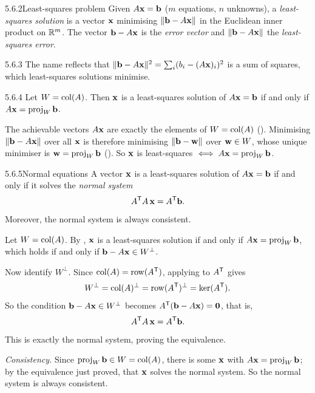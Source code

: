 \begin{defns}{5.6.2}{Least-squares problem}
Given $A\mathbf{x}=\mathbf{b}$ ($m$ equations, $n$ unknowns), a \emph{least-squares solution} is a vector $\mathbf{x}$ minimising $\lVert \mathbf{b}-A\mathbf{x} \rVert$ in the Euclidean inner product on $\mathbb{R}^m$. The vector $\mathbf{b}-A\mathbf{x}$ is the \emph{error vector} and $\lVert \mathbf{b}-A\mathbf{x} \rVert$ the \emph{least-squares error}.
\end{defns}

\begin{rmks}{5.6.3}
The name reflects that $\lVert \mathbf{b}-A\mathbf{x} \rVert^2=\sum_i(b_i-(A\mathbf{x})_i)^2$ is a sum of squares, which least-squares solutions minimise.
\end{rmks}

\begin{thms}{5.6.4}{}
Let $W=\operatorname{col}(A)$. Then $\mathbf{x}$ is a least-squares solution of $A\mathbf{x}=\mathbf{b}$ if and only if $A\mathbf{x}=\operatorname{proj}_W\mathbf{b}$.
\end{thms}

\begin{prf}
The achievable vectors $A\mathbf{x}$ are exactly the elements of $W=\operatorname{col}(A)$ (). Minimising $\lVert \mathbf{b}-A\mathbf{x} \rVert$ over all $\mathbf{x}$ is therefore minimising $\lVert \mathbf{b}-\mathbf{w} \rVert$ over $\mathbf{w}\in W$, whose unique minimiser is $\mathbf{w}=\operatorname{proj}_W\mathbf{b}$ (). So $\mathbf{x}$ is least-squares $\iff A\mathbf{x}=\operatorname{proj}_W\mathbf{b}$.
\end{prf}

\begin{thms}{5.6.5}{Normal equations}
A vector $\mathbf{x}$ is a least-squares solution of $A\mathbf{x}=\mathbf{b}$ if and only if it solves the \emph{normal system}
\[
A^{\mathsf{T}} A\,\mathbf{x}=A^{\mathsf{T}}\mathbf{b}.
\]
Moreover, the normal system is always consistent.
\end{thms}

\begin{prf}
Let $W=\operatorname{col}(A)$. By , $\mathbf{x}$ is a least-squares solution if and only if $A\mathbf{x}=\operatorname{proj}_W\mathbf{b}$, which holds if and only if $\mathbf{b}-A\mathbf{x}\in W^\perp$.

Now identify $W^\perp$. Since $\operatorname{col}(A)=\operatorname{row}(A^{\mathsf{T}})$, applying  to $A^{\mathsf{T}}$ gives
\[
W^\perp=\operatorname{col}(A)^\perp=\operatorname{row}(A^{\mathsf{T}})^\perp=\ker(A^{\mathsf{T}}).
\]
So the condition $\mathbf{b}-A\mathbf{x}\in W^\perp$ becomes $A^{\mathsf{T}}(\mathbf{b}-A\mathbf{x})=\mathbf{0}$, that is,
\[
A^{\mathsf{T}} A\,\mathbf{x}=A^{\mathsf{T}}\mathbf{b}.
\]
This is exactly the normal system, proving the equivalence.

\emph{Consistency.} Since $\operatorname{proj}_W\mathbf{b}\in W=\operatorname{col}(A)$, there is some $\mathbf{x}$ with $A\mathbf{x}=\operatorname{proj}_W\mathbf{b}$; by the equivalence just proved, that $\mathbf{x}$ solves the normal system. So the normal system is always consistent.
\end{prf}

